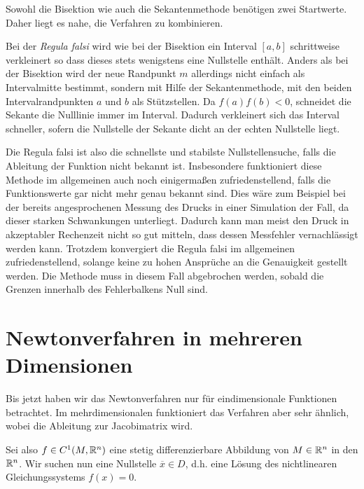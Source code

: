 Sowohl die Bisektion wie auch die Sekantenmethode benötigen zwei
Startwerte. Daher liegt es nahe, die Verfahren zu kombinieren.

Bei der \emph{Regula falsi} wird wie bei der Bisektion ein Interval
$[a,b]$ schrittweise verkleinert so dass dieses stets wenigstens eine
Nullstelle enthält. Anders als bei der Bisektion wird der neue
Randpunkt $m$ allerdings nicht einfach als Intervalmitte bestimmt,
sondern mit Hilfe der Sekantenmethode, mit den beiden
Intervalrandpunkten $a$ und $b$ als Stützstellen. Da $f(a)f(b)<0$,
schneidet die Sekante die Nulllinie immer im Interval.  Dadurch
verkleinert sich das Interval schneller, sofern die Nullstelle der
Sekante dicht an der echten Nullstelle liegt.

Die Regula falsi ist also die schnellste und stabilste
Nullstellensuche, falls die Ableitung der Funktion nicht bekannt
ist. Insbesondere funktioniert diese Methode im allgemeinen auch noch
einigermaßen zufriedenstellend, falls die Funktionswerte gar nicht
mehr genau bekannt sind. Dies wäre zum Beispiel bei der bereits
angesprochenen Messung des Drucks in einer Simulation der Fall, da
dieser starken Schwankungen unterliegt. Dadurch kann man meist den
Druck in akzeptabler Rechenzeit nicht so gut mitteln, dass dessen
Messfehler vernachlässigt werden kann.  Trotzdem konvergiert die
Regula falsi im allgemeinen zufriedenstellend, solange keine zu hohen
Ansprüche an die Genauigkeit gestellt werden. Die Methode muss in
diesem Fall abgebrochen werden, sobald die Grenzen innerhalb des
Fehlerbalkens Null sind.

\section{Newtonverfahren in mehreren Dimensionen}

Bis jetzt haben wir das Newtonverfahren nur für eindimensionale
Funktionen betrachtet. Im mehrdimensionalen funktioniert das Verfahren
aber sehr ähnlich, wobei die Ableitung zur Jacobimatrix wird.

Sei also $f\in C^1(M, \mathbb{R}^n)$ eine stetig differenzierbare Abbildung
von $M\in\mathbb{R}^n$ in den $\mathbb{R}^n$. Wir suchen nun eine Nullstelle
$\overline{x}\in D$, d.h. eine Lösung des nichtlinearen
Gleichungssystems $f(x) = 0$.

